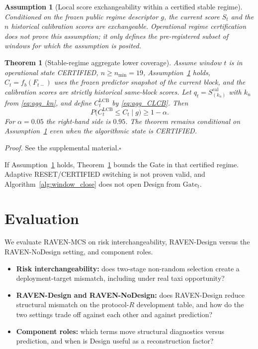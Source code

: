 \documentclass[letterpaper,journal]{IEEEtran}
\newtheorem{theorem}{Theorem}
\newtheorem{assumption}{Assumption}
\begin{document}
\begin{assumption}[Local score exchangeability within a certified stable regime]
\label{ass:score-exchangeability}
Conditioned on the frozen public regime descriptor $g$, the current score
$S_t$ and the $n$ historical calibration scores are exchangeable.  Operational
regime certification does not prove this assumption; it only defines the
pre-registered subset of windows for which the assumption is posited.
\end{assumption}

\begin{theorem}[Stable-regime aggregate lower coverage]
\label{thm:agg-lcb}
Assume window $t$ is in operational state CERTIFIED, $n\ge n_{\min}=19$,
Assumption~\ref{ass:score-exchangeability} holds, $\widehat C_t=f_b(F_{t-})$
uses the frozen predictor snapshot of the current block, and the calibration
scores are strictly historical same-block scores.  Let
$q_t=S_{(k_n)}^{\mathrm{cal}}$ with $k_n$ from \eqref{eq:agg_kn}, and define
$C^{\mathrm{LCB}}_t$ by \eqref{eq:agg_CLCB}.  Then
\begin{equation}
 P\bigl(C^{\mathrm{LCB}}_t\le C_t\mid g\bigr)\ge 1-\alpha.
 \label{eq:agg_thm1}
\end{equation}
For $\alpha=0.05$ the right-hand side is $0.95$.  The theorem remains
conditional on Assumption~\ref{ass:score-exchangeability} even when the
algorithmic state is CERTIFIED.
\end{theorem}

\noindent\emph{Proof.}
See the supplemental material.\hfill$\square$

If Assumption~\ref{ass:score-exchangeability} holds, Theorem~\ref{thm:agg-lcb}
bounds the Gate in that certified regime.  Adaptive RESET/CERTIFIED switching
is not proven valid, and Algorithm~\ref{alg:window_close} does not open Design
from $\mathrm{Gate}_t$.

\section{Evaluation}
\label{sec:evaluation}

We evaluate RAVEN-MCS on risk interchangeability, RAVEN-Design versus
the RAVEN-NoDesign setting, and component roles.

\begin{itemize}
    \item \textbf{Risk interchangeability:} does two-stage non-random selection
    create a deployment-target mismatch, including under real taxi opportunity?
    \item \textbf{RAVEN-Design and RAVEN-NoDesign:} does RAVEN-Design reduce
    structural mismatch on the protocol-$R$ development table, and how do the
    two settings trade off against each other and against prediction?
    \item \textbf{Component roles:} which terms move structural diagnostics
    versus prediction, and when is Design useful as a reconstruction factor?
\end{itemize}
\end{document}

